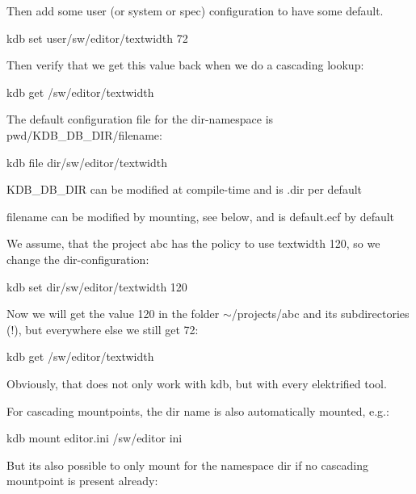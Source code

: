 Then add some user (or system or spec) configuration to have some default.


\begin{DoxyCode}
kdb set user/sw/editor/textwidth 72
\end{DoxyCode}


Then verify that we get this value back when we do a cascading lookup\+:


\begin{DoxyCode}
kdb get /sw/editor/textwidth
\end{DoxyCode}


The default configuration file for the dir-\/namespace is {\ttfamily pwd}/\+K\+D\+B\+\_\+\+D\+B\+\_\+\+D\+I\+R/filename\+:


\begin{DoxyCode}
kdb file dir/sw/editor/textwidth
\end{DoxyCode}



\begin{DoxyItemize}
\item K\+D\+B\+\_\+\+D\+B\+\_\+\+D\+IR can be modified at compile-\/time and is {\ttfamily .dir} per default
\item filename can be modified by mounting, see below, and is {\ttfamily default.\+ecf} by default
\end{DoxyItemize}

We assume, that the project abc has the policy to use textwidth 120, so we change the dir-\/configuration\+:


\begin{DoxyCode}
kdb set dir/sw/editor/textwidth 120
\end{DoxyCode}


Now we will get the value 120 in the folder $\sim$/projects/abc and its subdirectories (!), but everywhere else we still get 72\+:


\begin{DoxyCode}
kdb get /sw/editor/textwidth
\end{DoxyCode}


Obviously, that does not only work with kdb, but with every elektrified tool.

For cascading mountpoints, the dir name is also automatically mounted, e.\+g.\+:


\begin{DoxyCode}
kdb mount editor.ini /sw/editor ini
\end{DoxyCode}


But its also possible to only mount for the namespace dir if no cascading mountpoint is present already\+:



